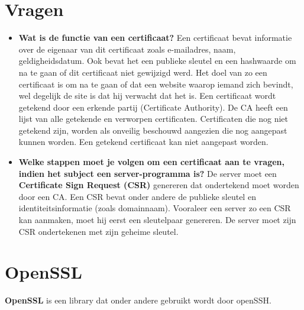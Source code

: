 \documentclass{report}
\begin{document}
	\tableofcontents
	
	\chapter{Vragen}
	\begin{itemize}
		\item \textbf{Wat is de functie van een certificaat?} Een certificaat bevat informatie over de eigenaar van dit certificaat zoals e-mailadres, naam, geldigheidsdatum. Ook bevat het een publieke sleutel en een hashwaarde om na te gaan of dit certificaat niet gewijzigd werd. Het doel van zo een certificaat is om na te gaan of dat een website waarop iemand zich bevindt, wel degelijk de site is dat hij verwacht dat het is. Een certificaat wordt getekend door een erkende partij (Certificate Authority). De CA heeft een lijst van alle getekende en verworpen certificaten. Certificaten die nog niet getekend zijn, worden als onveilig beschouwd aangezien die nog aangepast kunnen worden. Een getekend certificaat kan niet aangepast worden. 
		
		\item \textbf{Welke stappen moet je volgen om een certificaat aan te vragen, indien het subject een server-programma is?} De server moet een \textbf{Certificate Sign Request (CSR)} genereren dat ondertekend moet worden door een CA. Een CSR bevat onder andere de publieke sleutel en identiteitsinformatie (zoals domainnaam). Vooraleer een server zo een CSR kan aanmaken, moet hij eerst een sleutelpaar genereren. De server moet zijn CSR ondertekenen met zijn geheime sleutel. 
	\end{itemize}
	
	
	\chapter{OpenSSL}
	\textbf{OpenSSL} is een library dat onder andere gebruikt wordt door openSSH.
	
\end{document}
